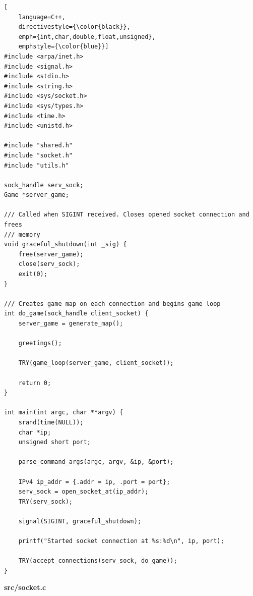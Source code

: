 \begin{lstlisting}[
    language=C++,
    directivestyle={\color{black}}, 
    emph={int,char,double,float,unsigned}, 
    emphstyle={\color{blue}}]
#include <arpa/inet.h>
#include <signal.h>
#include <stdio.h>
#include <string.h>
#include <sys/socket.h>
#include <sys/types.h>
#include <time.h>
#include <unistd.h>

#include "shared.h"
#include "socket.h"
#include "utils.h"

sock_handle serv_sock;
Game *server_game;

/// Called when SIGINT received. Closes opened socket connection and frees
/// memory
void graceful_shutdown(int _sig) {
    free(server_game);
    close(serv_sock);
    exit(0);
}

/// Creates game map on each connection and begins game loop
int do_game(sock_handle client_socket) {
    server_game = generate_map();

    greetings();

    TRY(game_loop(server_game, client_socket));

    return 0;
}

int main(int argc, char **argv) {
    srand(time(NULL));
    char *ip;
    unsigned short port;

    parse_command_args(argc, argv, &ip, &port);

    IPv4 ip_addr = {.addr = ip, .port = port};
    serv_sock = open_socket_at(ip_addr);
    TRY(serv_sock);

    signal(SIGINT, graceful_shutdown);

    printf("Started socket connection at %s:%d\n", ip, port);

    TRY(accept_connections(serv_sock, do_game));
}
\end{lstlisting}

\textbf{src/socket.c}

